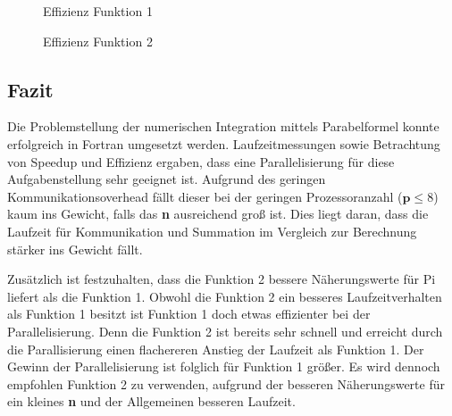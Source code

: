 \begin{figure}[h]
\begin{minipage}{0.49\textwidth}
	\caption{Effizienz Funktion 1}
	\label{ref:EffizienzF1}
\end{minipage}
\hfill
\begin{minipage}{0.49\textwidth}
	\caption{Effizienz Funktion 2}
	\label{ref:EffizienzF2}
\end{minipage}
\end{figure}
\subsection{Fazit}
\label{ref:fazit}
Die Problemstellung der numerischen Integration mittels Parabelformel konnte erfolgreich in Fortran umgesetzt werden.
Laufzeitmessungen sowie Betrachtung von Speedup und Effizienz ergaben, dass eine Parallelisierung für diese Aufgabenstellung sehr geeignet ist.
Aufgrund des geringen Kommunikationsoverhead fällt dieser bei der geringen Prozessoranzahl ($\textbf{p} \le 8$) kaum ins Gewicht, falls das \textbf{n} ausreichend groß ist.
Dies liegt daran, dass die Laufzeit für Kommunikation und Summation im Vergleich zur Berechnung stärker ins Gewicht fällt.

Zusätzlich ist festzuhalten, dass die Funktion 2 bessere Näherungswerte für Pi liefert als die Funktion 1.
Obwohl die Funktion 2 ein besseres Laufzeitverhalten als Funktion 1 besitzt ist Funktion 1 doch etwas effizienter bei der Parallelisierung.
Denn die Funktion 2 ist bereits sehr schnell und erreicht durch die Parallisierung einen flachereren Anstieg der Laufzeit als Funktion 1.
Der Gewinn der Parallelisierung ist folglich für Funktion 1 größer.
Es wird dennoch empfohlen Funktion 2 zu verwenden, aufgrund der besseren Näherungswerte für ein kleines \textbf{n} und der Allgemeinen besseren Laufzeit.


